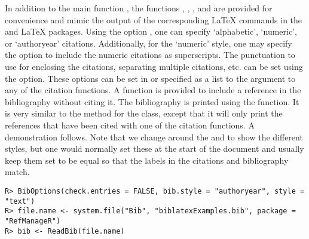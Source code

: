 \documentclass[article]{jss}\usepackage[]{graphicx}\usepackage[]{color}
\makeatletter
\newenvironment{kframe}{%
 \def\at@end@of@kframe{}%
 \ifinner\ifhmode%
  \def\at@end@of@kframe{\end{minipage}}%
  \begin{minipage}{\columnwidth}%
 \fi\fi%
 \def\FrameCommand##1{\hskip\@totalleftmargin \hskip-\fboxsep
 \colorbox{shadecolor}{##1}\hskip-\fboxsep
     \hskip-\linewidth \hskip-\@totalleftmargin \hskip\columnwidth}%
 \MakeFramed {\advance\hsize-\width
   \@totalleftmargin\z@ \linewidth\hsize
   \@setminipage}}%
 {\par\unskip\endMakeFramed%
 \at@end@of@kframe}
\newenvironment{knitrout}{}{} %
\makeatother
\begin{document}
In addition to the main function , the functions , , , and  are provided for convenience and mimic the output of the corresponding \LaTeX{} commands in the  \citep{natbib} and  \LaTeX{} packages.  Using the option , one can specify `alphabetic', `numeric', or `authoryear'  citations.  Additionally, for the `numeric' style, one may specify the option  to include the numeric citations as superscripts.  The punctuation to use for enclosing the citations, separating multiple citations, etc. can be set using the  option.  These options can be set in  or specified as a list to the  argument to any of the citation functions.  A function  is provided to include a reference in the bibliography without citing it.  The bibliography is printed using the  function.  It is very similar to the  method for the  class, except that it will only print the references that have been cited with one of the citation functions.  A demonstration follows.  Note that we change around the  and  to show the different styles, but one would normally set these at the start of the document and usually keep them set to be equal so that the labels in the citations and bibliography match.
\begin{knitrout}
\color{fgcolor}\begin{kframe}
\begin{verbatim}
R> BibOptions(check.entries = FALSE, bib.style = "authoryear", style = "text")
R> file.name <- system.file("Bib", "biblatexExamples.bib", package = "RefManageR")
R> bib <- ReadBib(file.name)
\end{verbatim}
\end{kframe}
\end{knitrout}
\end{document}
